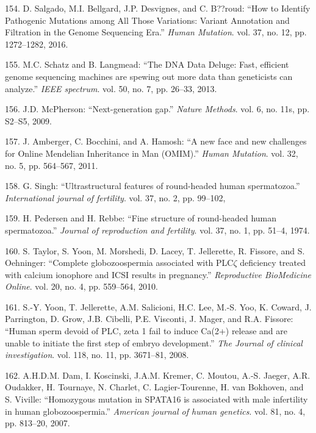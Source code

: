 \documentclass[12pt,twoside]{reedthesis}
\theoremstyle{definition}
\theoremstyle{definition}
\theoremstyle{remark}
\begin{document}
  \hypertarget{ref-Salgado2016}{}
  154. D. Salgado, M.I. Bellgard, J.P. Desvignes, and C. B??roud: ``How to
  Identify Pathogenic Mutations among All Those Variations: Variant
  Annotation and Filtration in the Genome Sequencing Era.'' \emph{Human
  Mutation}. vol. 37, no. 12, pp. 1272--1282, 2016.
  
  \hypertarget{ref-Schatz2013}{}
  155. M.C. Schatz and B. Langmead: ``The DNA Data Deluge: Fast, efficient
  genome sequencing machines are spewing out more data than geneticists
  can analyze.'' \emph{IEEE spectrum}. vol. 50, no. 7, pp. 26--33, 2013.
  
  \hypertarget{ref-McPherson2009}{}
  156. J.D. McPherson: ``Next-generation gap.'' \emph{Nature Methods}.
  vol. 6, no. 11s, pp. S2--S5, 2009.
  
  \hypertarget{ref-Amberger2011}{}
  157. J. Amberger, C. Bocchini, and A. Hamosh: ``A new face and new
  challenges for Online Mendelian Inheritance in Man (OMIM).'' \emph{Human
  Mutation}. vol. 32, no. 5, pp. 564--567, 2011.
  
  \hypertarget{ref-Singh}{}
  158. G. Singh: ``Ultrastructural features of round-headed human
  spermatozoa.'' \emph{International journal of fertility}. vol. 37, no.
  2, pp. 99--102,
  
  \hypertarget{ref-Pedersen1974}{}
  159. H. Pedersen and H. Rebbe: ``Fine structure of round-headed human
  spermatozoa.'' \emph{Journal of reproduction and fertility}. vol. 37,
  no. 1, pp. 51--4, 1974.
  
  \hypertarget{ref-Taylor2010}{}
  160. S. Taylor, S. Yoon, M. Morshedi, D. Lacey, T. Jellerette, R.
  Fissore, and S. Oehninger: ``Complete globozoospermia associated with
  PLC\(\zeta\) deficiency treated with calcium ionophore and ICSI results
  in pregnancy.'' \emph{Reproductive BioMedicine Online}. vol. 20, no. 4,
  pp. 559--564, 2010.
  
  \hypertarget{ref-Yoon2008}{}
  161. S.-Y. Yoon, T. Jellerette, A.M. Salicioni, H.C. Lee, M.-S. Yoo, K.
  Coward, J. Parrington, D. Grow, J.B. Cibelli, P.E. Visconti, J. Mager,
  and R.A. Fissore: ``Human sperm devoid of PLC, zeta 1 fail to induce
  Ca(2+) release and are unable to initiate the first step of embryo
  development.'' \emph{The Journal of clinical investigation}. vol. 118,
  no. 11, pp. 3671--81, 2008.
  
  \hypertarget{ref-Dam2007}{}
  162. A.H.D.M. Dam, I. Koscinski, J.A.M. Kremer, C. Moutou, A.-S. Jaeger,
  A.R. Oudakker, H. Tournaye, N. Charlet, C. Lagier-Tourenne, H. van
  Bokhoven, and S. Viville: ``Homozygous mutation in SPATA16 is associated
  with male infertility in human globozoospermia.'' \emph{American journal
  of human genetics}. vol. 81, no. 4, pp. 813--20, 2007.
  
\end{document}
